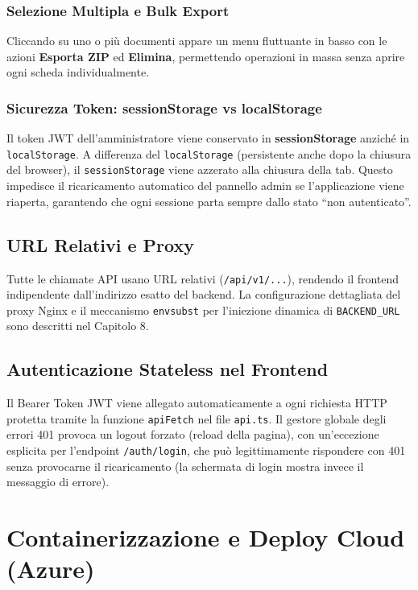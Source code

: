 \documentclass[12pt,a4paper,oneside]{report}
\begin{document}
\subsection{Selezione Multipla e Bulk Export}

Cliccando su uno o pi\`{u} documenti appare un menu fluttuante in basso con le azioni
\textbf{Esporta ZIP} ed \textbf{Elimina}, permettendo
operazioni in massa senza aprire ogni scheda individualmente.

\subsection{Sicurezza Token: sessionStorage vs localStorage}

Il token JWT dell'amministratore viene conservato in \textbf{sessionStorage} anziché
in \texttt{localStorage}. A differenza del \texttt{localStorage} (persistente anche
dopo la chiusura del browser), il \texttt{sessionStorage} viene azzerato alla chiusura
della tab. Questo impedisce il ricaricamento automatico del pannello admin se l'applicazione
viene riaperta, garantendo che ogni sessione parta sempre dallo stato ``non autenticato''.

\section{URL Relativi e Proxy}

Tutte le chiamate API usano URL relativi (\texttt{/api/v1/...}),
rendendo il frontend indipendente dall'indirizzo esatto del backend.
La configurazione dettagliata del proxy Nginx e il meccanismo \texttt{envsubst}
per l'iniezione dinamica di \texttt{BACKEND\_URL} sono descritti nel Capitolo 8.

\section{Autenticazione Stateless nel Frontend}

Il Bearer Token JWT viene allegato automaticamente a ogni richiesta HTTP
protetta tramite la funzione \texttt{apiFetch} nel file \texttt{api.ts}. Il gestore globale degli errori 401
provoca un logout forzato (reload della pagina), con un'eccezione esplicita
per l'endpoint \texttt{/auth/login}, che pu\`{o} legittimamente rispondere con 401 senza
provocarne il ricaricamento (la schermata di login mostra invece il messaggio di errore).

\chapter{Containerizzazione e Deploy Cloud (Azure)}
\end{document}
